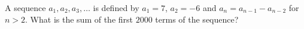 A sequence $a_1,a_2,a_3,\dots$ is defined by $a_1=7$, $a_2=-6$ and $a_n=a_{n-1}-a_{n-2}$ for $n>2$. What is the sum of the first $2000$ terms of the sequence?
